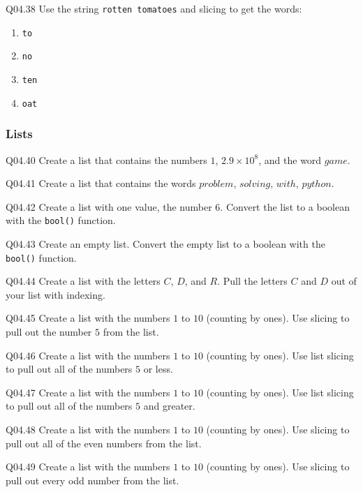 \documentclass{book}
\newcommand{\passthrough}[1]{#1}
\begin{document}
Q04.38 Use the string \passthrough{\lstinline!rotten tomatoes!} and
slicing to get the words:

\begin{enumerate}
\def\labelenumi{(\alph{enumi})}
\item
  \passthrough{\lstinline!to!}
\item
  \passthrough{\lstinline!no!}
\item
  \passthrough{\lstinline!ten!}
\item
  \passthrough{\lstinline!oat!}
\end{enumerate}
    




    
        \hypertarget{lists}{%
\subsubsection{Lists}\label{lists}}

Q04.40 Create a list that contains the numbers \(1\),
\(2.9 \times 10^8\), and the word \(game\).

Q04.41 Create a list that contains the words \(problem\), \(solving\),
\(with\), \(python\).

Q04.42 Create a list with one value, the number \(6\). Convert the list
to a boolean with the \passthrough{\lstinline!bool()!} function.

Q04.43 Create an empty list. Convert the empty list to a boolean with
the \passthrough{\lstinline!bool()!} function.

Q04.44 Create a list with the letters \(C\), \(D\), and \(R\). Pull the
letters \(C\) and \(D\) out of your list with indexing.

Q04.45 Create a list with the numbers \(1\) to \(10\) (counting by
ones). Use slicing to pull out the number \(5\) from the list.

Q04.46 Create a list with the numbers \(1\) to \(10\) (counting by
ones). Use list slicing to pull out all of the numbers \(5\) or less.

Q04.47 Create a list with the numbers \(1\) to \(10\) (counting by
ones). Use list slicing to pull out all of the numbers \(5\) and
greater.

Q04.48 Create a list with the numbers \(1\) to \(10\) (counting by
ones). Use slicing to pull out all of the even numbers from the list.

Q04.49 Create a list with the numbers \(1\) to \(10\) (counting by
ones). Use slicing to pull out every odd number from the list.
\end{document}
